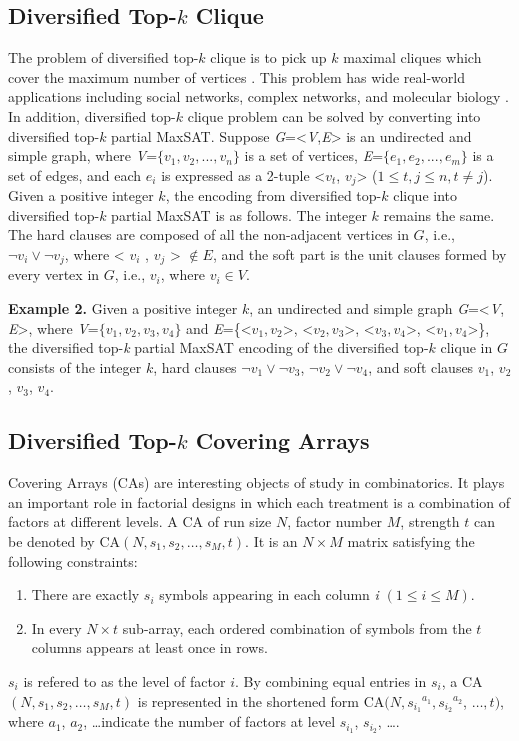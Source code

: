 \documentclass{llncs}
\begin{document}
\subsection{Diversified Top-$k$ Clique}
The problem of diversified top-$k$ clique is to pick up $k$ maximal cliques which cover the maximum number of vertices \cite{Long2015}. This problem has wide real-world applications including social networks, complex networks, and molecular biology \cite{N. Berry 2004,C. Lee 2010,X. Zheng 2011}. In addition, diversified top-$k$ clique problem can be solved by converting into diversified top-$k$ partial MaxSAT. Suppose \emph G=<\emph V,\emph E> is an undirected and simple graph, where \emph V=$\{v_1, v_2,..., v_n \}$ is a set of vertices, \emph E=$\{ e_1, e_2,..., e_m \}$ is a set of edges, and each $e_i$ is expressed as a 2-tuple <$v_t$, $v_j$> ($1\leq t,j\leq n, t\neq j$). Given a positive integer $k$, the encoding from diversified top-$k$ clique into diversified top-$k$ partial MaxSAT is as follows. The integer $k$ remains the same. The hard clauses are composed of all the non-adjacent vertices in $G$, i.e., $\neg v_i \vee \neg v_j$, where < $v_i$ , $v_j$ > $\notin E$, and the soft part is the unit clauses formed by every vertex in $G$, i.e., $v_i$, where $v_i \in V$.

\medskip\noindent
{\bfseries Example 2.} Given a positive integer $k$, an undirected and simple graph \emph G=<\emph V, \emph E>, where \emph V=$\{v_1, v_2, v_3, v_4\}$ and \emph E=\{<$v_1, v_2$>, <$v_2, v_3$>, <$v_3, v_4$>, <$v_1, v_4$>\}, the diversified top-\emph k partial MaxSAT encoding of the diversified top-$k$ clique in $G$ consists of the integer $k$, hard clauses $\neg v_1 \vee \neg v_3$, $\neg v_2 \vee \neg v_4$, and soft clauses $v_1$, $v_2$, $v_3$, $v_4$.

\subsection{Diversified Top-$k$ Covering Arrays}

Covering Arrays (CAs) are interesting objects of study in combinatorics. It plays an important role in factorial designs in which each treatment is a combination of factors at different levels. A CA of run size $N$, factor number $M$, strength $t$ can be denoted by CA$(N,s_1,s_2,\ldots,s_M,t)$. It is an $N\times M$ matrix satisfying the following constraints:
\begin{enumerate}
\item There are exactly $s_i$ symbols appearing in each column \textit {i} $(1\le i\le M)$.
\item In every $N\times t$ sub-array, each ordered combination of symbols from the $t$ columns appears at least once in rows.
\end{enumerate}
$s_i$ is refered to as the level of factor $i$. By combining equal entries in $s_i$, a CA$(N,s_1,s_2,\ldots,s_M,t)$ is represented in the shortened form CA$(N,{s_{i_1}}^{a_1},{s_{i_2}}^{a_2}$, $\ldots,t)$, where $a_1$, $a_2$, \ldots indicate the number of factors at level $s_{i_1}$, $s_{i_2}$, \ldots.
\end{document}
